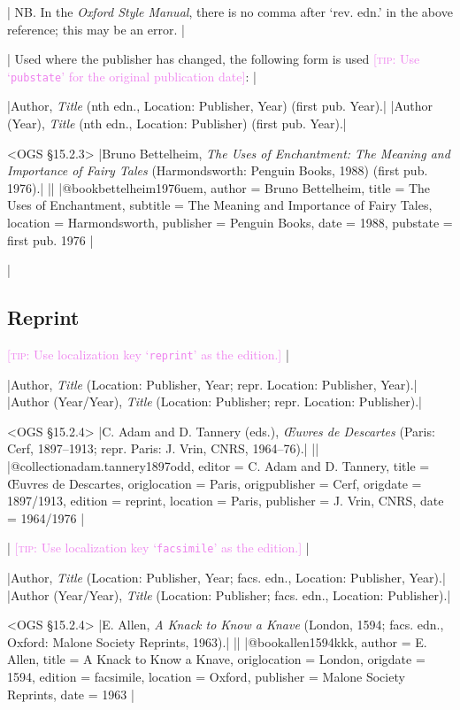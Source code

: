 \documentclass[extrafontsizes,11pt,a4paper,oneside]{memoir}
\newcommand*{\lit}[1]{\textsf{#1}}
\newcommand*{\code}[1]{`\texttt{#1}'}
\newcommand*{\aside}[1]{\textcolor{violet}{[\textsc{tip:} #1]}}
\begin{document}
\todoc[oxnotes]|
NB. In the \emph{Oxford Style Manual}, there is no comma after ‘rev. edn.’ in the above reference; this may be an error.
|

\todoc|
Used where the publisher has changed, the following form is used \aside{Use \code{pubstate} for the original publication date}:
|

\specs
|Author, \emph{Title} (nth \lit{edn.}, Location: Publisher, Year) (\lit{first pub.} Year).|%
|Author (Year), \emph{Title} (nth \lit{edn.}, Location: Publisher) (\lit{first pub.} Year).|

\bibexample<OGS \S15.2.3>
|Bruno Bettelheim, \emph{The Uses of Enchantment: The Meaning and Importance of Fairy Tales} (Harmondsworth: Penguin Books, 1988) (first pub. 1976).|%
||%
|@book{bettelheim1976uem,
  author = {Bruno Bettelheim},
  title = {The Uses of Enchantment},
  subtitle = {The Meaning and Importance of Fairy Tales},
  location = {Harmondsworth},
  publisher = {Penguin Books},
  date = {1988},
  pubstate = {first pub\adddotspace 1976}
}|
  
\todoc|
\subsection{Reprint}

\aside{Use localization key \code{reprint} as the edition.}
|

\specs
|Author, \emph{Title} (Location: Publisher, Year; \lit{repr.} Location: Publisher, Year).|%
|Author (Year/Year), \emph{Title} (Location: Publisher; \lit{repr.} Location: Publisher).|

\bibexample<OGS \S15.2.4>
|C. Adam and D. Tannery (eds.), \emph{Œuvres de Descartes} (Paris: Cerf, 1897--1913; repr. Paris: J. Vrin, CNRS, 1964--76).|%
||%
|@collection{adam.tannery1897odd,
  editor = {C. Adam and D. Tannery},
  title = {Œuvres de Descartes},
  origlocation = {Paris},
  origpublisher = {Cerf},
  origdate = {1897/1913},
  edition = {reprint},
  location = {Paris},
  publisher = {J. Vrin, CNRS},
  date = {1964/1976}
}|

\todoc|
\aside{Use localization key \code{facsimile} as the edition.}
|

\specs
|Author, \emph{Title} (Location: Publisher, Year; \lit{facs. edn.}, Location: Publisher, Year).|%
|Author (Year/Year), \emph{Title} (Location: Publisher; \lit{facs. edn.}, Location: Publisher).|

\bibexample<OGS \S15.2.4>
|E. Allen, \emph{A Knack to Know a Knave} (London, 1594; facs. edn., Oxford: Malone Society Reprints, 1963).|%
||%
|@book{allen1594kkk,
  author = {E. Allen},
  title = {A Knack to Know a Knave},
  origlocation = {London},
  origdate = {1594},
  edition = {facsimile},
  location = {Oxford},
  publisher = {Malone Society Reprints},
  date = {1963}
}|
\end{document}
